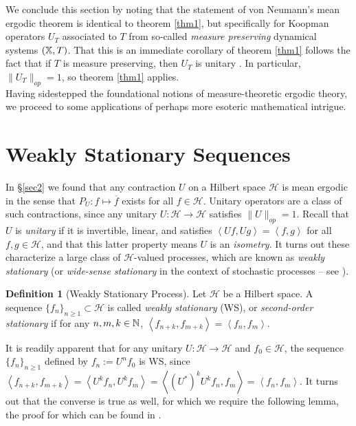\documentclass[11pt]{report}
\newcommand{\mc}[1]{\mathcal{#1}}
\newcommand{\ip}[2]{\left\langle#1,#2\right\rangle }
\newcommand{\1}[1]{\mathbbm{1}_{\{#1\}}}
\theoremstyle{definition}
\newtheorem{definition}{Definition}
\begin{document}
    We conclude this section by noting that the statement of von Neumann's mean
    ergodic theorem \cite{Neumann_1932} is identical to theorem \ref{thm1}, but
    specifically for Koopman operators $U_T$ associated to $T$ from so-called
    \textit{measure preserving} dynamical systems $(\mathbb{X},T)$. That this is an
    immediate corollary of theorem \ref{thm1} follows the fact that if $T$ is
    measure preserving, then $U_T$ is unitary \cite[Koopman's lemma;
    p.57]{Reed_Simon_1972}. In particular, $\|U_T\|_{op}=1$, so theorem
    \ref{thm1} applies.\\[5pt]
    \indent Having sidestepped the foundational notions of measure-theoretic
    ergodic theory, we proceed to some applications of perhaps more esoteric
    mathematical intrigue. 
    \section{Weakly Stationary Sequences}\label{sec3} In  \S\ref{sec2} we
    found that any contraction $U$ on a Hilbert space $\mc{H}$ is mean ergodic
    in the sense that $P_U:f\mapsto \overline{f}$ exists for all $f\in\mc{H}$.
    Unitary operators are a class of such contractions, since any unitary
    $U:\mc{H}\rightarrow\mc{H}$ satisfies $\|U\|_{op}=1$. Recall that $U$ is
    \textit{unitary} if it is invertible, linear, and satisfies
    $\ip{Uf}{Ug}=\ip{f}{g}$ for all $f,g\in\mc{H}$, and that this latter
    property means $U$ is an \textit{isometry}. It turns out these characterize
    a large class of $\mc{H}$-valued processes, which are known as \textit{weakly
    stationary} (or \textit{wide-sense stationary} in the context of stochastic
    processes -- see \cite[ch.15]{Koralov_Sinai_2007}).
    \begin{definition}[Weakly Stationary Process]\label{def3} Let $\mc{H}$ be a
        Hilbert space. A sequence $\{f_n\}_{n\geq 1}\subset\mc{H}$ is called
        \textit{weakly stationary} (WS), or \textit{second-order stationary} if for
        any $n,m,k\in\mathbb{N}$, $\ip{f_{n+k}}{f_{m+k}}=\ip{f_n}{f_m}$.
    \end{definition}
    It is readily apparent that for any unitary $U:\mc{H}\rightarrow\mc{H}$ and
    $f_0\in\mc{H}$, the sequence $\{f_n\}_{n\geq 1}$ defined by $f_n:=U^nf_0$ is
    WS, since
    $\ip{f_{n+k}}{f_{m+k}}=\ip{U^kf_n}{U^kf_m}=\ip{(U^\ast)^kU^kf_n}{f_m}=\ip{f_n}{f_m}$.
    It turns out that the converse is true as well, for which we require the
    following lemma, the proof for which can be found in \cite[lemma 2.1.2]{Weber_2000}.
\end{document}
